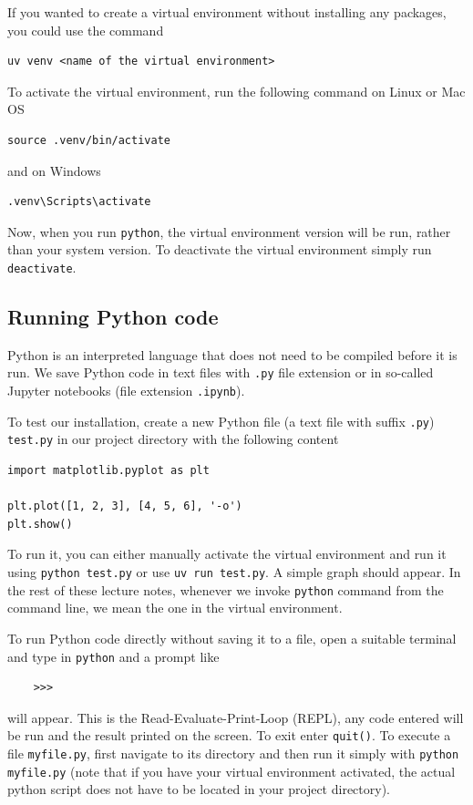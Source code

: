 \documentclass{article}
\begin{document}
If you wanted to create a virtual environment without installing any packages, you could use the command
\begin{lstlisting}
uv venv <name of the virtual environment>
\end{lstlisting}

To activate the virtual environment, run the following command on Linux or Mac OS
\begin{lstlisting}
source .venv/bin/activate
\end{lstlisting}
and on Windows
\begin{lstlisting}
.venv\Scripts\activate
\end{lstlisting}

Now, when you run \verb|python|, the virtual environment version will be run, rather than your system version. To deactivate the virtual environment simply run \verb|deactivate|.

\subsection{Running Python code}
Python is an interpreted language that does not need to be compiled before it is run. We save Python code in text files with \verb|.py| file extension or in so-called Jupyter notebooks (file extension \verb|.ipynb|).

To test our installation, create a new Python file (a text file with suffix \verb|.py|) \verb|test.py| in our project directory with the following content
\begin{lstlisting}
import matplotlib.pyplot as plt

plt.plot([1, 2, 3], [4, 5, 6], '-o')
plt.show()
\end{lstlisting}
To run it, you can either manually activate the virtual environment and run it using
\verb|python test.py| or use \verb|uv run test.py|. A simple graph should appear. In the rest of these lecture notes, whenever we invoke \verb|python| command from the command line, we mean the one in the virtual environment.

To run Python code directly without saving it to a file, open a suitable terminal and type in \verb|python| and a prompt like
\begin{lstlisting}
    >>>
\end{lstlisting}
will appear. This is the Read-Evaluate-Print-Loop (REPL), any code entered will be run and the result printed on the screen. To exit enter \verb|quit()|. To execute a file \verb|myfile.py|, first navigate to its directory and then run it simply with \verb|python myfile.py| (note that if you have your virtual environment activated, the actual python script does not have to be located in your project directory).
\end{document}
